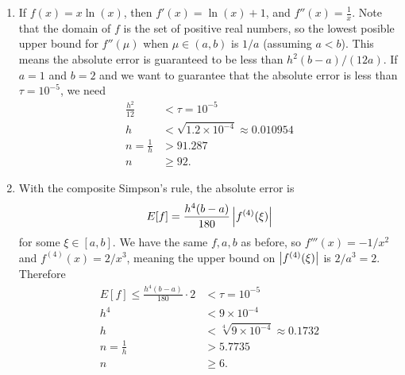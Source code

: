 \documentclass{article}
\begin{document}
\bigskip
\begin{prob}
\end{prob}
\begin{enumerate}[label=(\alph*)]
    \item If $f(x)=x \ln(x)$, then $f'(x) = \ln(x)+1$, and $f''(x) = \frac{1}{x}$. Note that the domain of $f$ is the set of positive real numbers, so the lowest posible upper bound for $f''(\mu)$ when $\mu \in (a,b)$ is $1/a$ (assuming $a < b$). This means the absolute error is guaranteed to be less than $h^2(b-a)/(12a)$. If $a=1$ and $b=2$ and we want to guarantee that the absolute error is less than $\tau = 10^{-5}$, we need \begin{align*}
            \frac{h^2}{12} &< \tau = 10^{-5} \\
            h &< \sqrt{1.2 \times 10^{-4}} \approx 0.010954 \\
            n = \frac{1}{h} &> 91.287 \\
            n &\geq 92.
    \end{align*}
\item With the composite Simpson's rule, the absolute error is
    \[ E[f] = \frac{h^4(b-a)}{180} \left\lvert f^{(4)}(\xi) \right\rvert \]
    for some $\xi \in [a,b]$. We have the same $f,a,b$ as before, so $f'''(x) = -1/x^2$ and $f^{(4)}(x)=2/x^3$, meaning the upper bound on $\left\lvert f^{(4)}(\xi) \right\rvert$ is $2/a^3=2$. Therefore \begin{align*}
        E[f] \leq \frac{h^4(b-a)}{180} \cdot 2 &< \tau = 10^{-5} \\
        h^4 &< 9 \times 10^{-4} \\
        h &< \sqrt[4]{9 \times 10^{-4}} \approx 0.1732 \\
        n = \frac{1}{h} &> 5.7735 \\
        n &\geq 6.
    \end{align*}
\end{enumerate}
\end{document}
